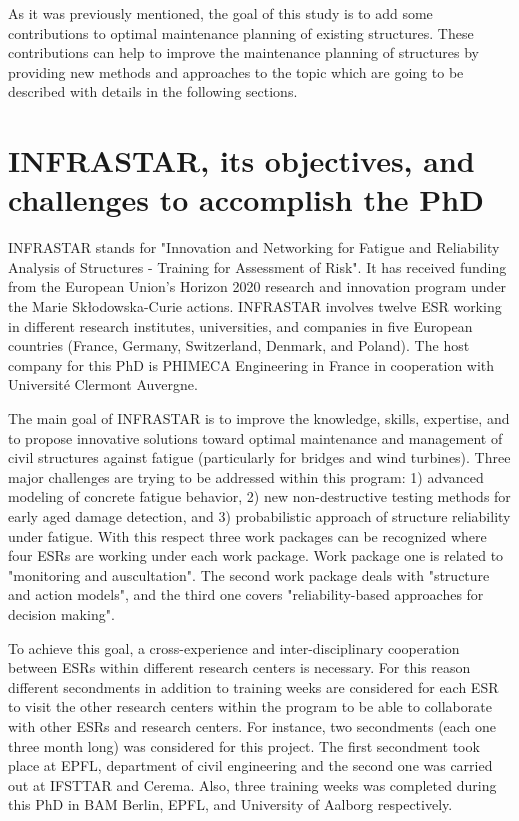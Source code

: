 As it was previously mentioned, the goal of this study is to add some contributions to optimal maintenance planning of existing structures. These contributions can help to improve the 
maintenance planning of structures by providing new methods and approaches to the topic which are going to be described with details in the following sections. 



\section*{INFRASTAR, its objectives, and challenges to accomplish the PhD} 

\noindent
INFRASTAR stands for "Innovation and Networking for Fatigue and Reliability Analysis of Structures - Training for Assessment of Risk". It has received funding from the European Union’s 
Horizon 2020 research and innovation program under the Marie Skłodowska-Curie actions. INFRASTAR involves twelve \ac{ESR} working in different research institutes, 
universities, and companies in five European countries (France, Germany, Switzerland, Denmark, and Poland). The host company for this PhD is PHIMECA Engineering in France in cooperation 
with Université Clermont Auvergne. 

The main goal of INFRASTAR is to improve the knowledge, skills, expertise, and to propose innovative solutions toward optimal maintenance and management of civil structures against fatigue
(particularly for bridges and wind turbines). Three major challenges are trying to be addressed within this program: 1) advanced modeling of concrete fatigue behavior, 2) new non-destructive 
testing methods for early aged damage detection, and 3) probabilistic approach of structure reliability under fatigue. With this respect three work packages can be recognized where four ESRs
are working under each work package. Work package one is related to "monitoring and auscultation". The second work package deals with "structure and action models", and the third one covers 
"reliability-based approaches for decision making". 

To achieve this goal, a cross-experience and inter-disciplinary cooperation between ESRs within different research centers is necessary. For this reason different secondments in addition to 
training weeks are considered for each ESR to visit the other research centers within the program to be able to collaborate with other ESRs and research centers. For instance, two secondments 
(each one three month long) was considered for this project. The first secondment took place at \ac{EPFL}, department of civil engineering and the second one was carried out at IFSTTAR
and Cerema. Also, three training weeks was completed during this PhD in BAM Berlin, EPFL, and University of Aalborg respectively. 

